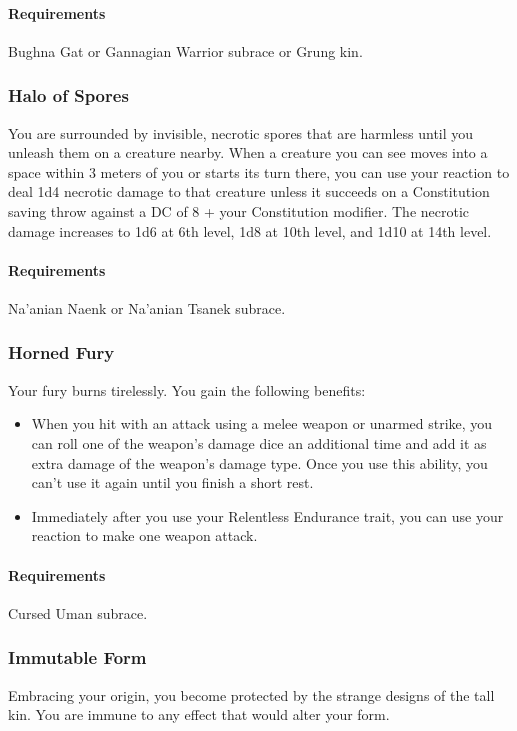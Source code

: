     \paragraph{Requirements} Bughna Gat or Gannagian Warrior subrace or Grung kin.
\subsubsection{Halo of Spores} \label{feat::haloofspores}
    You are surrounded by invisible, necrotic spores that are harmless until you unleash them on a creature nearby.
    When a creature you can see moves into a space within 3 meters of you or starts its turn there, you can use your reaction to deal 1d4 necrotic damage to that creature unless it succeeds on a Constitution saving throw against a DC of 8 + your Constitution modifier.
    The necrotic damage increases to 1d6 at 6th level, 1d8 at 10th level, and 1d10 at 14th level.
    \paragraph{Requirements} Na'anian Naenk or Na'anian Tsanek subrace.
\subsubsection{Horned Fury} \label{feat::hornedfury}
    Your fury burns tirelessly.
    You gain the following benefits:
    \begin{itemize}
        \item When you hit with an attack using a melee weapon or unarmed strike, you can roll one of the weapon's damage dice an additional time and add it as extra damage of the weapon's damage type.
        Once you use this ability, you can't use it again until you finish a short rest.
        \item Immediately after you use your Relentless Endurance trait, you can use your reaction to make one weapon attack.
    \end{itemize}
    \paragraph{Requirements} Cursed Uman subrace.
\subsubsection{Immutable Form} \label{feat::immutableform}
    Embracing your origin, you become protected by the strange designs of the tall kin.
    You are immune to any effect that would alter your form.
